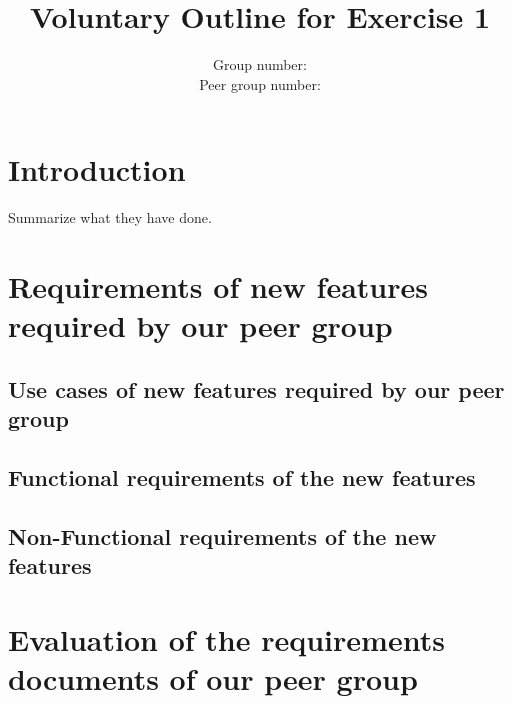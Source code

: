 \documentclass{homeworg}
\title{Voluntary Outline for Exercise 1}
\author{Group number:\\
Peer group number:
}
\begin{document}
\maketitle

\section{Introduction}
Summarize what they have done.
\section{Requirements of new features required by our peer group}
\subsection{Use cases of new features required by our peer group}
\subsection{Functional requirements of the new features}
\subsection{Non-Functional requirements of the new features}
\section{Evaluation of the requirements documents of our peer group}
\end{document}
